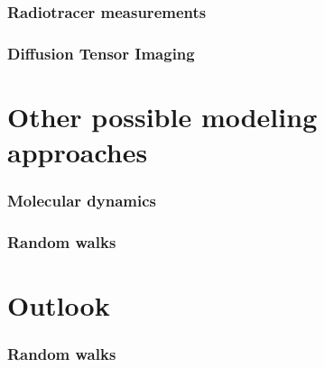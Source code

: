 \documentclass{beamer}
\begin{document}
 \begin{frame}
 \frametitle{Radiotracer measurements}
\end{frame}

 \begin{frame}
 \frametitle{Diffusion Tensor Imaging}
\end{frame}

\section{Other possible modeling approaches}
\begin{frame}
 \frametitle{Molecular dynamics}
\end{frame}

\begin{frame}
 \frametitle{Random walks}
\end{frame}

\section{Outlook}
\begin{frame}
 \frametitle{Random walks}
\end{frame}

\begin{frame}
\end{frame}
\end{document}
